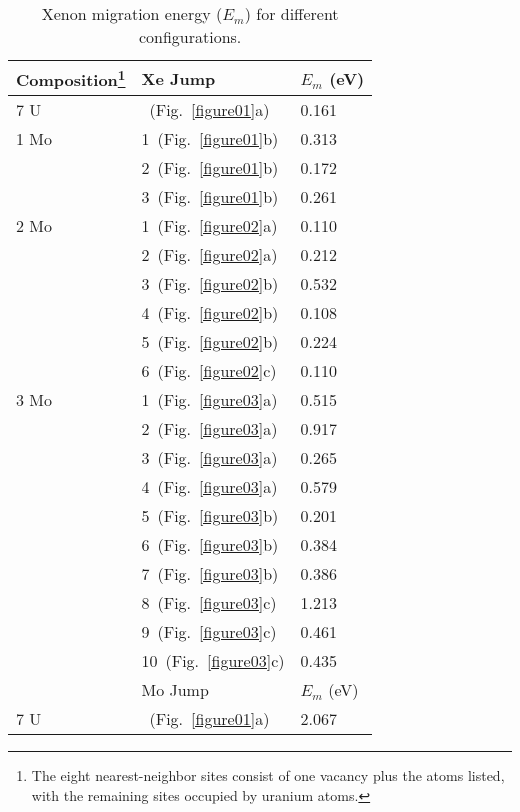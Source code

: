 \begin{table}
    \caption{Xenon migration energy ($E_m$) for different configurations.}
    \label{tab_acten}
    \centering
    \begin{minipage}{19.45em}
	\let\footnoterule\relax
    \begin{tabular}{ l l l }
      \toprule
        Composition\footnote{The eight nearest-neighbor sites consist of
            one vacancy plus the atoms listed, with the remaining sites
            occupied by uranium atoms.}
        & Xe Jump
        & $E_m$ (eV) \\
      \midrule
        7 U & ~(Fig.~\ref{figure01}a) & 0.161  \\
        1 Mo & 1~(Fig.~\ref{figure01}b) & 0.313 \\ 
             & 2~(Fig.~\ref{figure01}b) & 0.172 \\
             & 3~(Fig.~\ref{figure01}b) & 0.261 \\
        2 Mo & 1~(Fig.~\ref{figure02}a) & 0.110 \\
             & 2~(Fig.~\ref{figure02}a) & 0.212 \\
             & 3~(Fig.~\ref{figure02}b) & 0.532 \\
             & 4~(Fig.~\ref{figure02}b) & 0.108 \\
             & 5~(Fig.~\ref{figure02}b) & 0.224 \\
             & 6~(Fig.~\ref{figure02}c) & 0.110 \\
 	3 Mo & 1~(Fig.~\ref{figure03}a) & 0.515 \\
	     & 2~(Fig.~\ref{figure03}a) & 0.917	\\
	     & 3~(Fig.~\ref{figure03}a) & 0.265	\\
	     & 4~(Fig.~\ref{figure03}a) & 0.579	\\
	     & 5~(Fig.~\ref{figure03}b) & 0.201	\\
	     & 6~(Fig.~\ref{figure03}b) & 0.384	\\
	     & 7~(Fig.~\ref{figure03}b) & 0.386	\\
	     & 8~(Fig.~\ref{figure03}c) & 1.213	\\
	     & 9~(Fig.~\ref{figure03}c) & 0.461 \\
	     & 10~(Fig.~\ref{figure03}c) & 0.435 \\
      \midrule
             & Mo Jump & $E_m$ (eV) \\%
      \midrule
        7 U & ~(Fig.~\ref{figure01}a)  & 2.067 \\
      \bottomrule
    \end{tabular}
    \end{minipage}
\end{table}

